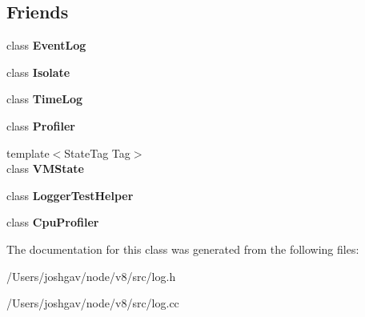\subsection*{Friends}
\begin{DoxyCompactItemize}
\item 
class {\bfseries Event\+Log}\hypertarget{classv8_1_1internal_1_1_logger_a640116136ce15d7180db4807ac2fbe77}{}\label{classv8_1_1internal_1_1_logger_a640116136ce15d7180db4807ac2fbe77}

\item 
class {\bfseries Isolate}\hypertarget{classv8_1_1internal_1_1_logger_aba4f0964bdacf2bbf62cf876e5d28d0a}{}\label{classv8_1_1internal_1_1_logger_aba4f0964bdacf2bbf62cf876e5d28d0a}

\item 
class {\bfseries Time\+Log}\hypertarget{classv8_1_1internal_1_1_logger_a1c4918f5f53a4fc9fcdaa6bca4bf5204}{}\label{classv8_1_1internal_1_1_logger_a1c4918f5f53a4fc9fcdaa6bca4bf5204}

\item 
class {\bfseries Profiler}\hypertarget{classv8_1_1internal_1_1_logger_ad73e5645d5b7b84a00d4a5d07b8d8078}{}\label{classv8_1_1internal_1_1_logger_ad73e5645d5b7b84a00d4a5d07b8d8078}

\item 
{\footnotesize template$<$State\+Tag Tag$>$ }\\class {\bfseries V\+M\+State}\hypertarget{classv8_1_1internal_1_1_logger_a625fbe66123c83b3cafa99a202c00225}{}\label{classv8_1_1internal_1_1_logger_a625fbe66123c83b3cafa99a202c00225}

\item 
class {\bfseries Logger\+Test\+Helper}\hypertarget{classv8_1_1internal_1_1_logger_a4702c0b6e47a7a03f8fee92352c3209f}{}\label{classv8_1_1internal_1_1_logger_a4702c0b6e47a7a03f8fee92352c3209f}

\item 
class {\bfseries Cpu\+Profiler}\hypertarget{classv8_1_1internal_1_1_logger_acb7d0754758c89612a316001c25d07c4}{}\label{classv8_1_1internal_1_1_logger_acb7d0754758c89612a316001c25d07c4}

\end{DoxyCompactItemize}


The documentation for this class was generated from the following files\+:\begin{DoxyCompactItemize}
\item 
/\+Users/joshgav/node/v8/src/log.\+h\item 
/\+Users/joshgav/node/v8/src/log.\+cc\end{DoxyCompactItemize}
